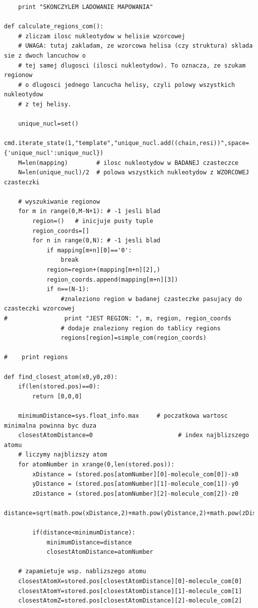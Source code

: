 \documentclass[licencjacka]{pracamgr}
\begin{document}
\begin{lstlisting}
    print "SKONCZYLEM LADOWANIE MAPOWANIA"
    
def calculate_regions_com():
    # zliczam ilosc nukleotydow w helisie wzorcowej
    # UWAGA: tutaj zakladam, ze wzorcowa helisa (czy struktura) sklada sie z dwoch lancuchow o 
    # tej samej dlugosci (ilosci nukleotydow). To oznacza, ze szukam regionow 
    # o dlugosci jednego lancucha helisy, czyli polowy wszystkich nukleotydow
    # z tej helisy.
    
    unique_nucl=set()
    cmd.iterate_state(1,"template","unique_nucl.add((chain,resi))",space={'unique_nucl':unique_nucl})
    M=len(mapping)        # ilosc nukleotydow w BADANEJ czasteczce
    N=len(unique_nucl)/2  # polowa wszystkich nukleotydow z WZORCOWEJ czasteczki
    
    # wyszukiwanie regionow
    for m in range(0,M-N+1): # -1 jesli blad
        region=()   # inicjuje pusty tuple
        region_coords=[]
        for n in range(0,N): # -1 jesli blad
            if mapping[m+n][0]=='0':
                break
            region=region+(mapping[m+n][2],)
            region_coords.append(mapping[m+n][3])
            if n==(N-1):
                #znaleziono region w badanej czasteczke pasujacy do czasteczki wzorcowej
#                print "JEST REGION: ", m, region, region_coords
                # dodaje znaleziony region do tablicy regions
                regions[region]=simple_com(region_coords)
            
#    print regions

def find_closest_atom(x0,y0,z0):
    if(len(stored.pos)==0):
        return [0,0,0]
    
    minimumDistance=sys.float_info.max     # poczatkowa wartosc minimalna powinna byc duza
    closestAtomDistance=0                        # index najblizszego atomu
    # liczymy najblizszy atom 
    for atomNumber in xrange(0,len(stored.pos)):
        xDistance = (stored.pos[atomNumber][0]-molecule_com[0])-x0
        yDistance = (stored.pos[atomNumber][1]-molecule_com[1])-y0
        zDistance = (stored.pos[atomNumber][2]-molecule_com[2])-z0
        distance=sqrt(math.pow(xDistance,2)+math.pow(yDistance,2)+math.pow(zDistance,2))
        
        if(distance<minimumDistance):
            minimumDistance=distance
            closestAtomDistance=atomNumber
    
    # zapamietuje wsp. nablizszego atomu
    closestAtomX=stored.pos[closestAtomDistance][0]-molecule_com[0]
    closestAtomY=stored.pos[closestAtomDistance][1]-molecule_com[1]
    closestAtomZ=stored.pos[closestAtomDistance][2]-molecule_com[2]
    

\end{lstlisting}
\end{document}

